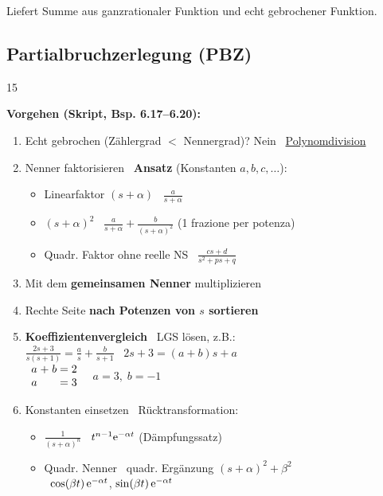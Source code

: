 Liefert Summe aus ganzrationaler Funktion und echt gebrochener Funktion.


\label{chap:polynomdivision}

    

\subsection{Partialbruchzerlegung (PBZ)}{15}
    
\textbf{Vorgehen (Skript, Bsp. 6.17--6.20):}
\begin{enumerate}[leftmargin=1cm]
    \item Echt gebrochen (Zählergrad $<$ Nennergrad)? Nein \textrightarrow\ \hyperref[chap:polynomdivision]{Polynomdivision}
    \item Nenner faktorisieren \textrightarrow\ \textbf{Ansatz} (Konstanten $a, b, c, \dots$):
    \begin{itemize}[leftmargin=1em]
        \item Linearfaktor $(s+\alpha)$ \textrightarrow\ $\frac{a}{s+\alpha}$
        \item $(s+\alpha)^2$ \textrightarrow\ $\frac{a}{s+\alpha} + \frac{b}{(s+\alpha)^2}$ \; (1 frazione per potenza)
        \item Quadr. Faktor ohne reelle NS \textrightarrow\ $\frac{cs+d}{s^2+ps+q}$
    \end{itemize}
    \item Mit dem \textbf{gemeinsamen Nenner} multiplizieren
    \item Rechte Seite \textbf{nach Potenzen von $s$ sortieren}
    \item \textbf{Koeffizientenvergleich} \textrightarrow\ LGS lösen, z.B.: \\
        $\frac{2s+3}{s(s+1)} = \frac{a}{s} + \frac{b}{s+1}$ \textrightarrow\ $2s+3 = (a+b)s + a$ \\[2pt]
        $\begin{array}{r@{\;}c@{\;}r@{\;}c@{\;}l}
            a & + & b & = & 2 \\
            a &   &   & = & 3
        \end{array}$
        \quad \textrightarrow\ $a=3, \; b=-1$
    \item Konstanten einsetzen \textrightarrow\ Rücktransformation:
    \begin{itemize}[leftmargin=1em]
        \item $\frac{1}{(s+\alpha)^n}$ \textrightarrow\ $t^{n-1}\mathrm{e}^{-\alpha t}$ (Dämpfungssatz)
        \item Quadr. Nenner \textrightarrow\ quadr. Ergänzung $(s+\alpha)^2+\beta^2$ \\
            \textrightarrow\ $\cos(\beta t)\,\mathrm{e}^{-\alpha t}$, \; $\sin(\beta t)\,\mathrm{e}^{-\alpha t}$
    \end{itemize}
\end{enumerate}


